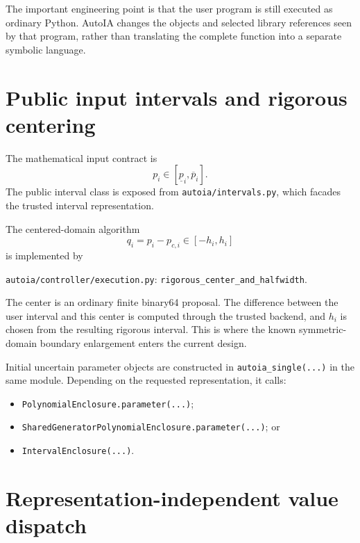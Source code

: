 \documentclass[11pt]{article}
\newcommand{\codepath}[1]{\nolinkurl{#1}}
\begin{document}
The important engineering point is that the user program is still executed as
ordinary Python.  AutoIA changes the objects and selected library references seen
by that program, rather than translating the complete function into a separate
symbolic language.

\section{Public input intervals and rigorous centering}

The mathematical input contract is
\[
  p_i\in[\underline p_i,\overline p_i].
\]
The public interval class is exposed from \codepath{autoia/intervals.py}, which
facades the trusted interval representation.

The centered-domain algorithm
\[
  q_i=p_i-p_{c,i}\in[-h_i,h_i]
\]
is implemented by
\begin{center}
\codepath{autoia/controller/execution.py}: \texttt{rigorous\_center\_and\_halfwidth}.
\end{center}
The center is an ordinary finite binary64 proposal.  The difference between the
user interval and this center is computed through the trusted backend, and
\(h_i\) is chosen from the resulting rigorous interval.  This is where the known
symmetric-domain boundary enlargement enters the current design.

Initial uncertain parameter objects are constructed in
\texttt{autoia\_single(...)} in the same module.  Depending on the requested
representation, it calls:
\begin{itemize}[leftmargin=*]
\item \texttt{PolynomialEnclosure.parameter(...)};
\item \texttt{SharedGeneratorPolynomialEnclosure.parameter(...)}; or
\item \texttt{IntervalEnclosure(...)}.
\end{itemize}

\section{Representation-independent value dispatch}
\end{document}
